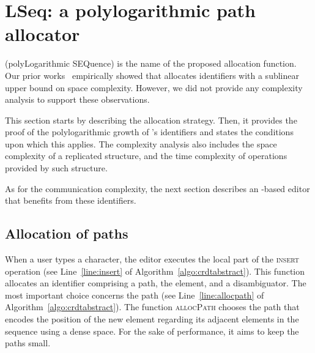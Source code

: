 \newcommand{\PARAGRAPH}{-20pt}
\newcommand{\ABOVETABLES}{8pt}

\section{LSeq: a polylogarithmic path allocator}
\label{sec:proposal}

\LSEQ (poly\textsc{L}ogarithmic \textsc{SEQ}uence) is the name of the proposed
allocation function.
Our prior works~\cite{nedelec2013concurrency, nedelec2013lseq} empirically
showed that \LSEQ allocates identifiers with a sublinear upper bound on space
complexity.  However, we did not provide any complexity analysis to support
these observations.


This section starts by describing the allocation strategy. Then, it provides the
proof of the polylogarithmic growth of \LSEQ's identifiers and states the
conditions upon which this applies. The complexity analysis also includes the
space complexity of a replicated structure, and the time complexity of
operations provided by such structure.

\noindent As for the communication complexity, the next section describes
an \LSEQ-based editor that benefits from these identifiers.

\subsection{Allocation of paths}
\label{subsec:lseqallocation}

When a user types a character, the editor executes the local part of the
\textsc{insert} operation (see Line~\ref{line:insert} of
Algorithm~\ref{algo:crdtabstract}). This function allocates an identifier
comprising a path, the element, and a disambiguator. The most important choice
concerns the path (see Line~\ref{line:allocpath} of
Algorithm~\ref{algo:crdtabstract}).
\noindent The function \textsc{allocPath} chooses the path that encodes the
position of the new element regarding its adjacent elements in the sequence
using a dense space. For the sake of performance, it aims to keep the paths
small.

